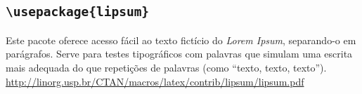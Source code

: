 \subsection*{\texttt{\textbackslash usepackage\{lipsum\}}}
Este pacote oferece acesso fácil ao texto fictício do \emph{Lorem Ipsum}, 
separando-o em parágrafos.
Serve para testes tipográficos com palavras que simulam uma escrita mais 
adequada do que repetições de palavras (como ``texto, texto, texto'').\\
{\small\url{http://linorg.usp.br/CTAN/macros/latex/contrib/lipsum/lipsum.pdf}}

